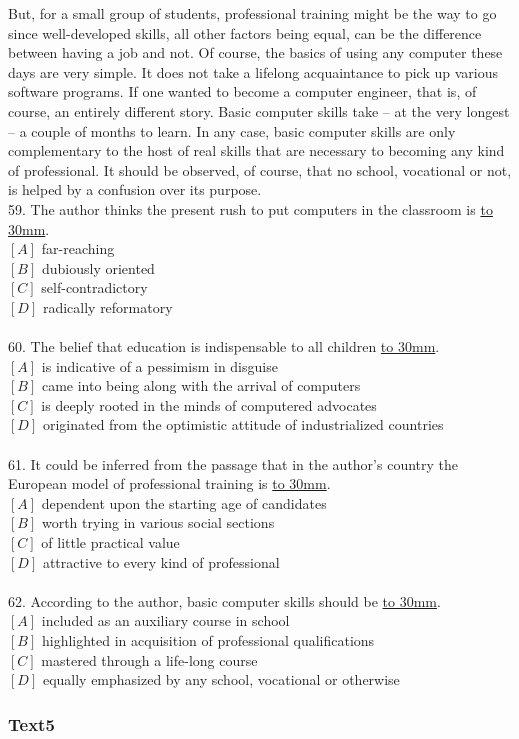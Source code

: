 \documentclass[a4paper]{article}
\begin{document}
\par
But, for a small group of students, professional training might be the way to go since well-developed skills, all other factors being equal, can be the difference between having a job and not. Of course, the basics of using any computer these days are very simple. It does not take a lifelong acquaintance to pick up various software programs. If one wanted to become a computer engineer, that is, of course, an entirely different story. Basic computer skills take -- at the very longest -- a couple of months to learn. In any case, basic computer skills are only complementary to the host of real skills that are necessary to becoming any kind of professional. It should be observed, of course, that no school, vocational or not, is helped by a confusion over its purpose.
\\59.	The author thinks the present rush to put computers in the classroom is \underline{\hbox to 30mm{}}.\\$[A]$ far-reaching\\$[B]$ dubiously oriented\\$[C]$ self-contradictory\\$[D]$ radically reformatory\\\\60.	The belief that education is indispensable to all children \underline{\hbox to 30mm{}}.\\$[A]$ is indicative of a pessimism in disguise\\$[B]$ came into being along with the arrival of computers\\$[C]$ is deeply rooted in the minds of computered advocates\\$[D]$ originated from the optimistic attitude of industrialized countries\\\\61.	It could be inferred from the passage that in the author’s country the European model of professional training is \underline{\hbox to 30mm{}}.\\$[A]$ dependent upon the starting age of candidates\\$[B]$ worth trying in various social sections\\$[C]$ of little practical value\\$[D]$ attractive to every kind of professional\\\\62.	According to the author, basic computer skills should be \underline{\hbox to 30mm{}}.\\$[A]$ included as an auxiliary course in school\\$[B]$ highlighted in acquisition of professional qualifications\\$[C]$ mastered through a life-long course\\$[D]$ equally emphasized by any school, vocational or otherwise\\\subsubsection{Text5}
\end{document}
